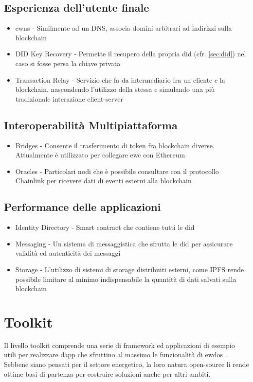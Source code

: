 \subsection{Esperienza dell'utente finale}
\begin{itemize}
    \item \gls{ewns} - Similmente ad un DNS, associa domini arbitrari ad indirizzi sulla blockchain
    \item DID Key Recovery - Permette il recupero della propria \gls{did}  (cfr. \autoref{sec:did})
    nel caso si fosse persa la chiave privata
    \item Transaction Relay - Servizio che fa da intermediario fra un cliente e la blockchain, nascondendo l'utilizzo della stessa e simulando una più tradizionale interazione client-server
\end{itemize}

\subsection{Interoperabilità Multipiattaforma}
\begin{itemize}
    \item Bridges - Consente il trasferimento di token fra blockchain diverse. Attualmente è utilizzato per collegare \gls{ewc} con Ethereum
    \item Oracles - Particolari nodi che è possibile consultare con il protocollo Chainlink per ricevere dati di eventi esterni alla blockchain \cite{art:oracles} \cite{wiki:oracles} 
\end{itemize}

\subsection{Performance delle applicazioni}
\begin{itemize}
    \item Identity Directory - Smart contract che contiene tutti le \gls{did}
    \item Messaging - Un sistema di messaggistica che sfrutta le \gls{did} per assicurare validità ed autenticità dei messaggi
    \item Storage - L'utilizzo di sistemi di storage distribuiti esterni, come IPFS \cite{wiki:ipfs}  rende possibile limitare al minimo indispensabile la quantità di dati salvati sulla blockchain
\end{itemize}

\section{Toolkit}
Il livello toolkit comprende una serie di framework ed applicazioni di esempio utili per realizzare \gls{dapp} che sfruttino al massimo le funzionalità di \gls{ewdos} \cite{art:ew-dos}.
Sebbene siano pensati per il settore energetico, la loro natura open-source li rende ottime basi di partenza per costruire soluzioni anche per altri ambiti.

